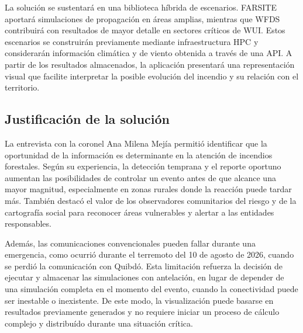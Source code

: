 La solución se sustentará en una biblioteca híbrida de escenarios. FARSITE aportará simulaciones de propagación en áreas amplias, mientras que WFDS contribuirá con resultados de mayor detalle en sectores críticos de WUI. Estos escenarios se construirán previamente mediante infraestructura HPC y considerarán información climática y de viento obtenida a través de una API. A partir de los resultados almacenados, la aplicación presentará una representación visual que facilite interpretar la posible evolución del incendio y su relación con el territorio.

\subsection{Justificación de la solución}

La entrevista con la coronel Ana Milena Mejía permitió identificar que la oportunidad de la información es determinante en la atención de incendios forestales. Según su experiencia, la detección temprana y el reporte oportuno aumentan las posibilidades de controlar un evento antes de que alcance una mayor magnitud, especialmente en zonas rurales donde la reacción puede tardar más. También destacó el valor de los observadores comunitarios del riesgo y de la cartografía social para reconocer áreas vulnerables y alertar a las entidades responsables.

Además, las comunicaciones convencionales pueden fallar durante una emergencia, como ocurrió durante el terremoto del 10 de agosto de 2026, cuando se perdió la comunicación con Quibdó. Esta limitación refuerza la decisión de ejecutar y almacenar las simulaciones con antelación, en lugar de depender de una simulación completa en el momento del evento, cuando la conectividad puede ser inestable o inexistente. De este modo, la visualización puede basarse en resultados previamente generados y no requiere iniciar un proceso de cálculo complejo y distribuído durante una situación crítica.
